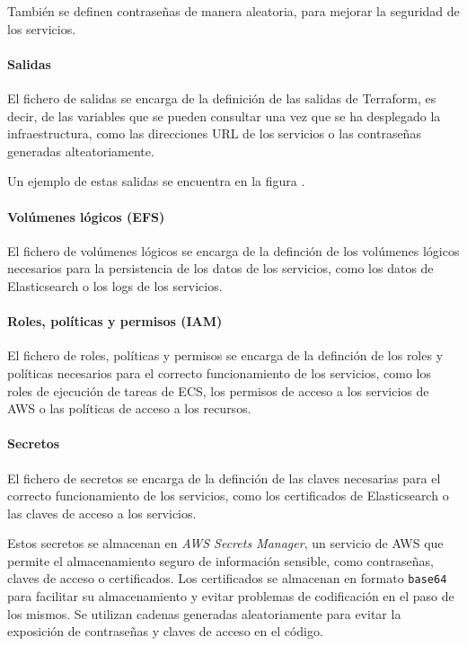 También se definen contraseñas de manera aleatoria, para mejorar la seguridad
de los servicios.


\paragraph{Salidas}
El fichero de salidas  se encarga de la
definición de las salidas de Terraform, es decir, de las variables que se pueden
consultar una vez que se ha desplegado la infraestructura, como las direcciones
URL de los servicios o las contraseñas generadas alteatoriamente.

Un ejemplo de estas salidas se encuentra en la figura
.


\newpage{}
\paragraph{Volúmenes lógicos (EFS)}
El fichero de volúmenes lógicos  se encarga de la
definción de los volúmenes lógicos necesarios para la persistencia de los datos
de los servicios, como los datos de Elasticsearch o los logs de los servicios.


\paragraph{Roles, políticas y permisos (IAM)}
El fichero de roles, políticas y permisos  se encarga
de la definción de los roles y políticas necesarios para el correcto
funcionamiento de los servicios, como los roles de ejecución de tareas de ECS,
los permisos de acceso a los servicios de AWS o las políticas de acceso a los
recursos.


\paragraph{Secretos}
El fichero de secretos  se encarga de la
definción de las claves necesarias para el correcto funcionamiento de los
servicios, como los certificados de Elasticsearch o las claves de acceso a los
servicios.

Estos secretos se almacenan en \textit{AWS Secrets Manager}, un servicio de AWS
que permite el almacenamiento seguro de información sensible, como contraseñas,
claves de acceso o certificados. Los certificados se almacenan en formato
\texttt{base64} para facilitar su almacenamiento y evitar problemas de
codificación en el paso de los mismos. Se utilizan cadenas generadas
aleatoriamente para evitar la exposición de contraseñas y claves de acceso en el
código.


